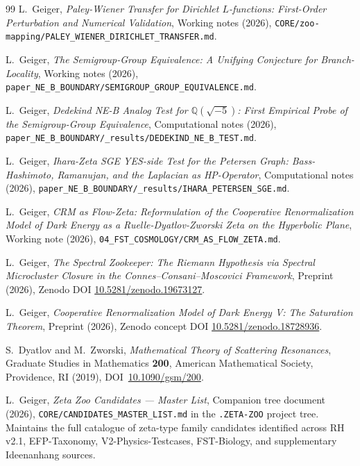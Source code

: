 \documentclass[11pt]{article}
\theoremstyle{definition}
\theoremstyle{remark}
\begin{document}
\begin{thebibliography}{99}
L.~Geiger, \emph{Paley-Wiener Transfer for Dirichlet $L$-functions:
First-Order Perturbation and Numerical Validation}, Working notes
(2026),
\texttt{CORE/zoo-mapping/PALEY\_WIENER\_DIRICHLET\_TRANSFER.md}.

L.~Geiger, \emph{The Semigroup-Group Equivalence: A Unifying
Conjecture for Branch-Locality}, Working notes (2026),
\texttt{paper\_NE\_B\_BOUNDARY/SEMIGROUP\_GROUP\_EQUIVALENCE.md}.

L.~Geiger, \emph{Dedekind NE-B Analog Test for
$\mathbb{Q}(\sqrt{-5})$: First Empirical Probe of the
Semigroup-Group Equivalence}, Computational notes (2026),
\texttt{paper\_NE\_B\_BOUNDARY/\_results/DEDEKIND\_NE\_B\_TEST.md}.

L.~Geiger, \emph{Ihara-Zeta SGE YES-side Test for the Petersen
Graph: Bass-Hashimoto, Ramanujan, and the Laplacian as HP-Operator},
Computational notes (2026),
\texttt{paper\_NE\_B\_BOUNDARY/\_results/IHARA\_PETERSEN\_SGE.md}.

L.~Geiger, \emph{CRM as Flow-Zeta: Reformulation of the Cooperative
Renormalization Model of Dark Energy as a Ruelle-Dyatlov-Zworski
Zeta on the Hyperbolic Plane}, Working note (2026),
\texttt{04\_FST\_COSMOLOGY/CRM\_AS\_FLOW\_ZETA.md}.

L.~Geiger, \emph{The Spectral Zookeeper: The Riemann Hypothesis via
Spectral Microcluster Closure in the Connes--Consani--Moscovici
Framework}, Preprint (2026), Zenodo DOI
\href{https://doi.org/10.5281/zenodo.19673127}{10.5281/zenodo.19673127}.

L.~Geiger, \emph{Cooperative Renormalization Model of Dark Energy V:
The Saturation Theorem}, Preprint (2026), Zenodo concept DOI
\href{https://doi.org/10.5281/zenodo.18728936}{10.5281/zenodo.18728936}.

S.~Dyatlov and M.~Zworski, \emph{Mathematical Theory of Scattering
Resonances}, Graduate Studies in Mathematics \textbf{200}, American
Mathematical Society, Providence, RI (2019),
DOI~\href{https://doi.org/10.1090/gsm/200}{10.1090/gsm/200}.

L.~Geiger, \emph{Zeta Zoo Candidates --- Master List}, Companion
tree document (2026),
\texttt{CORE/CANDIDATES\_MASTER\_LIST.md} in the
\texttt{.ZETA-ZOO} project tree. Maintains the full
catalogue of zeta-type family candidates identified across RH
v2.1, EFP-Taxonomy, V2-Physics-Testcases, FST-Biology, and
supplementary Ideenanhang sources.


\end{thebibliography}
\end{document}
